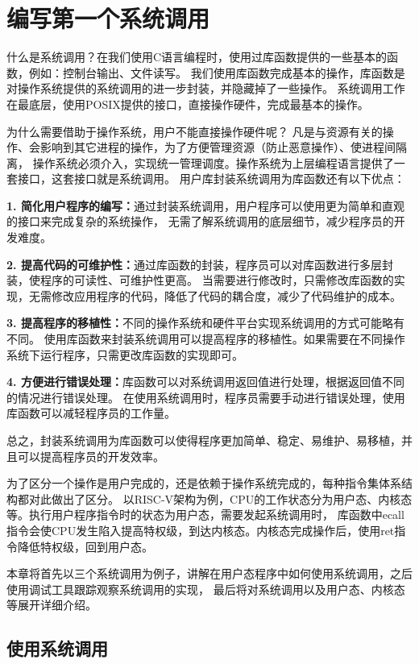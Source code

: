 \chapter{编写第一个系统调用}

什么是系统调用？在我们使用C语言编程时，使用过库函数提供的一些基本的函数，例如：控制台输出、文件读写。
我们使用库函数完成基本的操作，库函数是对操作系统提供的系统调用的进一步封装，并隐藏掉了一些操作。
系统调用工作在最底层，使用POSIX提供的接口，直接操作硬件，完成最基本的操作。

为什么需要借助于操作系统，用户不能直接操作硬件呢？
凡是与资源有关的操作、会影响到其它进程的操作，为了方便管理资源（防止恶意操作）、使进程间隔离，
操作系统必须介入，实现统一管理调度。操作系统为上层编程语言提供了一套接口，这套接口就是系统调用。
用户库封装系统调用为库函数还有以下优点：

\textbf{1. 简化用户程序的编写：}通过封装系统调用，用户程序可以使用更为简单和直观的接口来完成复杂的系统操作，
无需了解系统调用的底层细节，减少程序员的开发难度。

\textbf{2. 提高代码的可维护性：}通过库函数的封装，程序员可以对库函数进行多层封装，使程序的可读性、可维护性更高。
当需要进行修改时，只需修改库函数的实现，无需修改应用程序的代码，降低了代码的耦合度，减少了代码维护的成本。

\textbf{3. 提高程序的移植性：}不同的操作系统和硬件平台实现系统调用的方式可能略有不同。
使用库函数来封装系统调用可以提高程序的移植性。如果需要在不同操作系统下运行程序，只需更改库函数的实现即可。

\textbf{4. 方便进行错误处理：}库函数可以对系统调用返回值进行处理，根据返回值不同的情况进行错误处理。
在使用系统调用时，程序员需要手动进行错误处理，使用库函数可以减轻程序员的工作量。

总之，封装系统调用为库函数可以使得程序更加简单、稳定、易维护、易移植，并且可以提高程序员的开发效率。

为了区分一个操作是用户完成的，还是依赖于操作系统完成的，每种指令集体系结构都对此做出了区分。
以RISC-V架构为例，CPU的工作状态分为用户态、内核态等。执行用户程序指令时的状态为用户态，需要发起系统调用时，
库函数中ecall指令会使CPU发生陷入提高特权级，到达内核态。内核态完成操作后，使用ret指令降低特权级，回到用户态。

本章将首先以三个系统调用为例子，讲解在用户态程序中如何使用系统调用，之后使用调试工具跟踪观察系统调用的实现，
最后将对系统调用以及用户态、内核态等展开详细介绍。

\section{使用系统调用}

